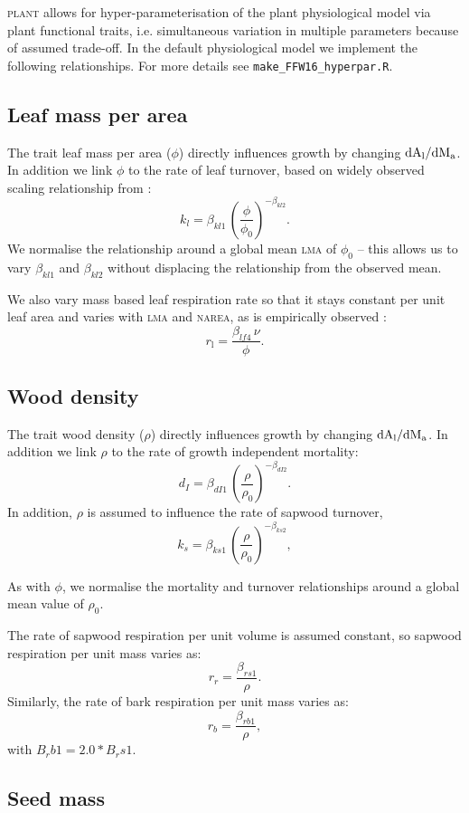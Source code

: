 \documentclass[10pt,twoside]{article}
\newcommand{\plant}{\textsc{plant}}
\begin{document}
{\plant} allows for
hyper-parameterisation of the plant physiological model via plant functional traits, i.e.
simultaneous variation in multiple parameters because of assumed trade-off. In the
default physiological model we implement the following relationships. For more
details see \texttt{make\_FFW16\_hyperpar.R}.

\subsection{Leaf mass per area}

The trait leaf mass per area ($\phi$) directly influences growth by changing
$\rm{d}A_\textrm{l} / \rm{d}M_\textrm{a}$. In addition we
link $\phi$ to the rate of leaf turnover,
based on widely observed scaling relationship from \citet{Wright-2004}:
$$k_l = \beta_{kl1} \, \left(\frac{\phi}{\phi_0}\right)^{-\beta_{kl2}}.$$
We normalise the relationship around a global mean \textsc{lma} of $\phi_0$ -- this
allows us to vary $\beta_{kl1}$ and $\beta_{kl2}$ without displacing the relationship from the
observed mean.

We also vary mass based leaf respiration rate so that it stays constant per unit leaf area and
varies with \textsc{lma} and \textsc{narea}, as is empirically observed \citet{Wright-2004}:
$$r_\textrm{l} = \frac{\beta_{lf4}\, \nu}{\phi}.$$

\subsection{Wood density}

The trait wood density ($\rho$) directly influences growth by changing
$\rm{d}A_\textrm{l} / \rm{d}M_\textrm{a}$.  In addition we
link $\rho$ to the rate of growth independent mortality:
$$d_I = \beta_{dI1} \, \left(\frac{\rho}{\rho_0}\right) ^ {-\beta_{dI2}}.$$
In addition, $\rho$ is assumed to influence the rate of sapwood turnover,
$$k_s = \beta_{ks1} \, \left(\frac{\rho}{\rho_0}\right)^ {-\beta_{ks2}},$$

As with $\phi$, we normalise the mortality and turnover
relationships around a global mean value of $\rho_0$.

The rate of sapwood respiration per unit volume is assumed constant, so
sapwood respiration per unit mass varies as:
$$r_r = \frac{\beta_{rs1}}{\rho}.$$
Similarly, the rate of bark respiration per unit mass varies as:
$$r_b = \frac{\beta_{rb1}}{\rho},$$
with $B_rb1 = 2.0*B_rs1$.

\subsection{Seed mass}
\end{document}

